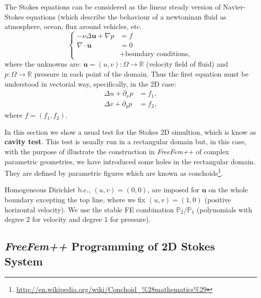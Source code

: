 \documentclass[12pt]{article}
\newcommand{\FF}{\textit{FreeFem++}\xspace}
\renewcommand{\P}{\mathbb{P}_}
\newcommand{\R}{{\mathbb R}}
\begin{document}
The Stokes equations can be considered as the linear steady version of
Navier-Stokes equations (which describe the behaviour of a newtoninan
fluid as atmosphere, ocean, flux around vehicles, etc.
\begin{equation*}
  \left\{
  \begin{aligned}
    -\nu\Delta \mathbf{u}+ \nabla p &= f
    \\
    \nabla\cdot \mathbf{u} & = 0
    \\ & + \text{boundary conditions},
  \end{aligned}
  \right.
\end{equation*}
where the unknowns are: $\mathbf{u}=(u,v):\Omega\to\R$ (velocity field
of fluid) and $p:\Omega\to\R$ pressure in each point of the domain.
Thus the first equation must be understood in vectorial way,
specifically, in the 2D case:
\begin{align*}
  \Delta u + \partial_x p &= f_1, \\
  \Delta v + \partial_y p &= f_2,
\end{align*}
where  $f=(f_1,f_2)$.

In this section we show a usual test for the Stokes 2D simultion,
which is know as \textbf{cavity test}. This test is usually run in a
rectangular domain but, in this case, with the purpose of illustrate
the construction in \FF of complex parametric geometries, we have
introduced some holes in the rectangular domain. They are defined by
parametric figures which are known as
conchoids\footnote{\url{http://en.wikipedia.org/wiki/Conchoid_\%28mathematics\%29}}.

Homogeneous Dirichlet b.c., $(u,v)=(0,0)$, are imposed for
$\mathbf{u}$ on the whole boundary excepting the top line, where we
fix $(u,v)=(1,0)$  (positive horizontal velocity). We use the stable
FE combination  $\P2/\P1$ (polynomials with degree $2$ for velocity
and degree $1$ for pressure).



\subsection{\FF Programming of 2D Stokes System}
\end{document}
